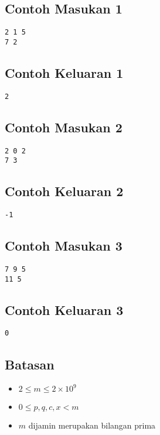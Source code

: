 \documentclass{article}
\begin{document}
\subsection*{Contoh Masukan 1}

\begin{lstlisting}
2 1 5
7 2
\end{lstlisting}

\subsection*{Contoh Keluaran 1}

\begin{lstlisting}
2
\end{lstlisting}

\subsection*{Contoh Masukan 2}

\begin{lstlisting}
2 0 2
7 3
\end{lstlisting}

\subsection*{Contoh Keluaran 2}

\begin{lstlisting}
-1
\end{lstlisting}

\subsection*{Contoh Masukan 3}

\begin{lstlisting}
7 9 5
11 5
\end{lstlisting}

\subsection*{Contoh Keluaran 3}

\begin{lstlisting}
0
\end{lstlisting}

\subsection*{Batasan}

\begin{itemize}
  \item $2 \leq m \leq 2 \times {10}^9$
  \item $0 \leq p, q, c, x < m$
  \item $m$ dijamin merupakan bilangan prima
\end{itemize}
\end{document}
